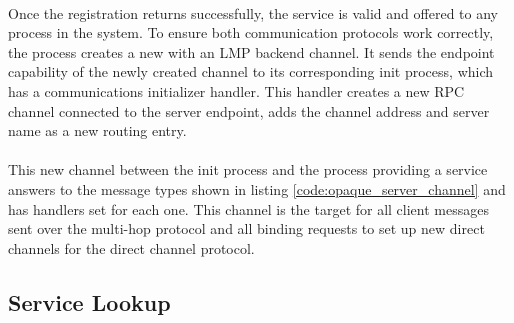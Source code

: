 \paragraph{}
Once the registration returns successfully, the service is valid and offered to any process in the system. To ensure both communication protocols work correctly, the process creates a new  with an LMP backend channel. It sends the endpoint capability of the newly created channel to its corresponding init process, which has a communications initializer handler. This handler creates a new RPC channel connected to the server endpoint, adds the channel address and server name as a new routing entry. 


\paragraph{}
This new channel between the init process and the process providing a service answers to the message types shown in listing \ref{code:opaque_server_channel} and has handlers set for each one. This channel is the target for all client messages sent over the multi-hop protocol and all binding requests to set up new direct channels for the direct channel protocol.

\subsection{Service Lookup} \label{ns_lookup}

